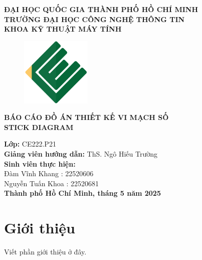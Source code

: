 \documentclass[a4paper,12pt]{article}
\begin{document}
\thispagestyle{empty} %
\begin{center}
\textbf{\Large ĐẠI HỌC QUỐC GIA THÀNH PHỐ HỒ CHÍ MINH}\\
\textbf{\Large TRƯỜNG ĐẠI HỌC CÔNG NGHỆ THÔNG TIN}\\
\textbf{\Large KHOA KỸ THUẬT MÁY TÍNH}\\[1cm]

\begin{figure}[H]
    \centering
    \includegraphics[width=0.3\textwidth]{../PNG/CE.png}
    \label{fig:LOGO_CE}\\
\end{figure}

\vspace {2cm}

\textbf{\Large BÁO CÁO ĐỒ ÁN THIẾT KẾ VI MẠCH SỐ}\\
\textbf{\Large STICK DIAGRAM}\\[8cm]

\begin{flushleft}

\textbf{Lớp:} CE222.P21\\
\textbf{Giảng viên hướng dẫn:} ThS. Ngô Hiếu Trường\\[1cm]

\textbf{Sinh viên thực hiện:} \\
Đàm Vĩnh Khang : 22520606 \\
Nguyễn Tuấn Khoa : 22520681\\[3cm]
\textbf{Thành phố Hồ Chí Minh, tháng 5 năm 2025}
\end{flushleft}
\end{center}

\newpage

\tableofcontents
\newpage


\section{Giới thiệu}
Viết phần giới thiệu ở đây.
\end{document}
